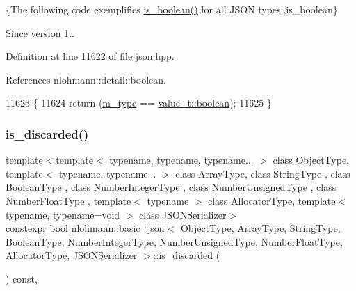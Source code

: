 \{The following code exemplifies {\ttfamily \hyperlink{classnlohmann_1_1basic__json_a943e8cb182d0f2365c76d64b42eaa6fd}{is\+\_\+boolean()}} for all J\+S\+ON types.,is\+\_\+boolean\}

\begin{DoxySince}{Since}
version 1.. 
\end{DoxySince}


Definition at line 11622 of file json.\+hpp.



References nlohmann\+::detail\+::boolean.


\begin{DoxyCode}
11623     \{
11624         \textcolor{keywordflow}{return} (\hyperlink{classnlohmann_1_1basic__json_a91990b60d7d4d67968a2c1db677536e7}{m\_type} == \hyperlink{namespacenlohmann_1_1detail_a1ed8fc6239da25abcaf681d30ace4985a84e2c64f38f78ba3ea5c905ab5a2da27}{value\_t::boolean});
11625     \}
\end{DoxyCode}
\mbox{\label{classnlohmann_1_1basic__json_aabe623bc8304c2ba92d96d91f390fab4}} 
\subsubsection{\texorpdfstring{is\+\_\+discarded()}{is\_discarded()}}
{\footnotesize\ttfamily template$<$template$<$ typename, typename, typename... $>$ class Object\+Type, template$<$ typename, typename... $>$ class Array\+Type, class String\+Type , class Boolean\+Type , class Number\+Integer\+Type , class Number\+Unsigned\+Type , class Number\+Float\+Type , template$<$ typename $>$ class Allocator\+Type, template$<$ typename, typename=void $>$ class J\+S\+O\+N\+Serializer$>$ \\
constexpr bool \hyperlink{classnlohmann_1_1basic__json}{nlohmann\+::basic\+\_\+json}$<$ Object\+Type, Array\+Type, String\+Type, Boolean\+Type, Number\+Integer\+Type, Number\+Unsigned\+Type, Number\+Float\+Type, Allocator\+Type, J\+S\+O\+N\+Serializer $>$\+::is\+\_\+discarded (\begin{DoxyParamCaption}{ }\end{DoxyParamCaption}) const\hspace{0.3cm}{\ttfamily [inline]}, {\ttfamily [noexcept]}}



